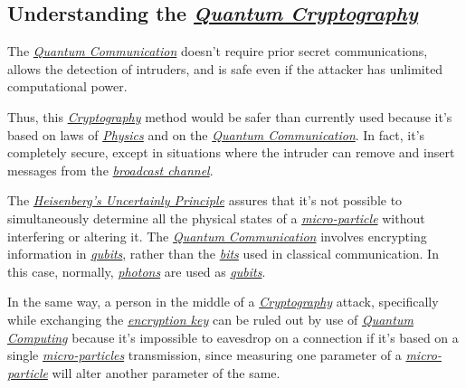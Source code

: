 \documentclass[conference]{IEEEtran}
\begin{document}
\vspace{6pt}

\subsection{Understanding the \href{https://en.wikipedia.org/wiki/Quantum_cryptography}{\textit{Quantum Cryptography}}}\label{A4}

The \href{https://en.wikipedia.org/wiki/Quantum_information_science}{\textit{Quantum Communication}} doesn't require prior secret communications, allows the detection of intruders, and is safe even if the attacker has unlimited computational power.

\vspace{4pt}

Thus, this \href{https://en.wikipedia.org/wiki/Cryptography}{\textit{Cryptography}} method would be safer than currently used because it's based on laws of \href{https://en.wikipedia.org/wiki/Physics}{\textit{Physics}} and on the \href{https://en.wikipedia.org/wiki/Quantum_information_science}{\textit{Quantum Communication}}. In fact, it's completely secure, except in situations where the intruder can remove and insert messages from the \href{https://en.wikipedia.org/wiki/Broadcasting}{\textit{broadcast channel}}.

\vspace{4pt}

The \href{https://en.wikipedia.org/wiki/Uncertainty_principle}{\textit{Heisenberg's Uncertainly Principle}} assures that it's not possible to simultaneously determine all the physical states of a \href{https://en.wikipedia.org/wiki/Microparticle}{\textit{micro-particle}} without interfering or altering it. The \href{https://en.wikipedia.org/wiki/Quantum_information_science}{\textit{Quantum Communication}} involves encrypting information in \href{https://en.wikipedia.org/wiki/Qubit}{\textit{qubits}}, rather than the \href{https://en.wikipedia.org/wiki/Bit}{\textit{bits}} used in classical communication. In this case, normally, \href{https://en.wikipedia.org/wiki/Photon}{\textit{photons}} are used as \href{https://en.wikipedia.org/wiki/Qubit}{\textit{qubits}}.

\vspace{4pt}

In the same way, a person in the middle of a \href{https://en.wikipedia.org/wiki/Cryptography}{\textit{Cryptography}} attack, specifically while exchanging the \href{https://en.wikipedia.org/wiki/Key_(cryptography)}{\textit{encryption key}} can be ruled out by use of \href{https://en.wikipedia.org/wiki/Quantum_computing}{\textit{Quantum Computing}} because it's impossible to eavesdrop on a connection if it's based on a single \href{https://en.wikipedia.org/wiki/Microparticle}{\textit{micro-particles}} transmission, since measuring one parameter of a \href{https://en.wikipedia.org/wiki/Microparticle}{\textit{micro-particle}} will alter another parameter of the same.
\end{document}

